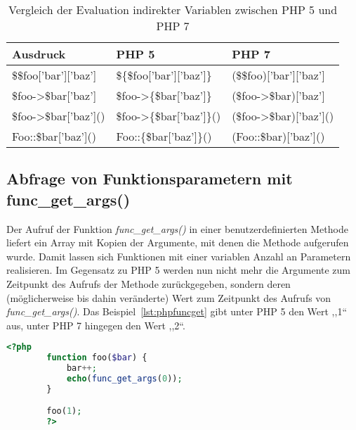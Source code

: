     \begin{table}[]
        \caption{Vergleich der Evaluation indirekter Variablen zwischen PHP 5 und PHP 7}
        \label{tab:indirect-expressions}
        \begin{tabular}{lll}
        \textbf{Ausdruck}               & \textbf{PHP 5}                    & \textbf{PHP 7}                \\ \hline
        \$\$foo{[}'bar'{]}{[}'baz'{]}   & \$\{\$foo{[}'bar'{]}{[}'baz'{]}\} & (\$\$foo){[}'bar'{]}{[}'baz'{]} \\ \hline
        \$foo->\$bar{[}'baz'{]}         & \$foo->\{\$bar{[}'baz'{]}\}       & (\$foo->\$bar){[}'baz'{]}       \\ \hline
        \$foo->\$bar{[}'baz'{]}()       & \$foo->\{\$bar{[}'baz'{]}\}()     & (\$foo->\$bar){[}'baz'{]}()     \\ \hline
        Foo::\$bar{[}'baz'{]}()         & Foo::\{\$bar{[}'baz'{]}\}()       & (Foo::\$bar){[}'baz'{]}()    
        \end{tabular}
    \end{table}

    \subsection{Abfrage von Funktionsparametern mit func\_get\_args()}
    Der Aufruf der Funktion \textit{func\_get\_args()} in einer benutzerdefinierten Methode liefert ein Array mit Kopien der 
    Argumente, mit denen die Methode aufgerufen wurde. Damit lassen sich Funktionen mit einer variablen Anzahl an Parametern 
    realisieren. Im Gegensatz zu \ac{PHP} 5 werden nun nicht mehr die Argumente zum Zeitpunkt des Aufrufs der Methode 
    zurückgegeben, sondern deren (möglicherweise bis dahin veränderte) Wert zum Zeitpunkt des Aufrufs von 
    \textit{func\_get\_args()}. Das Beispiel~\ref{lst:phpfuncget} gibt unter \ac{PHP} 5 den Wert ,,1`` aus, unter \ac{PHP} 7 
    hingegen den Wert ,,2``.

    \begin{lstlisting}[language=php, caption={Beispiel des Aufrufs von func\_get\_args()}, label={lst:phpfuncget}]
        <?php
        function foo($bar) {
            bar++;
            echo(func_get_args(0));
        }

        foo(1);
        ?>
    \end{lstlisting}

